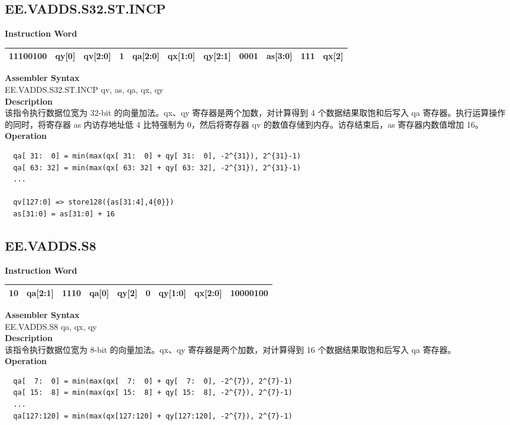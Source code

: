 \clearpage
\subsection{EE.VADDS.S32.ST.INCP}\label{instruction:EEVADDSS32STINCP}
\setlength\tabcolsep{6pt}
\textbf{Instruction Word} \\
\begin{tabular}{|c|c|c|c|c|c|c|c|c|c|c|}
	\hline
	11100100 & qy[0] & qv[2:0] & 1 & qa[2:0] & qx[1:0] & qy[2:1] & 0001 & as[3:0] & 111 & qx[2] \\
	\hline
\end{tabular}

\textbf{Assembler Syntax} \\
EE.VADDS.S32.ST.INCP qv, as, qa, qx, qy \\
\textbf{Description} \\
该指令执行数据位宽为 32-bit 的向量加法。qx、qy 寄存器是两个加数，对计算得到 4 个数据结果取饱和后写入 qa 寄存器。执行运算操作的同时，将寄存器 as 内访存地址低 4 比特强制为 0，然后将寄存器 qv 的数值存储到内存。访存结束后，as 寄存器内数值增加 16。\\
\textbf{Operation}
\begin{lstlisting}
  qa[ 31:  0] = min(max(qx[ 31:  0] + qy[ 31:  0], -2^{31}), 2^{31}-1)
  qa[ 63: 32] = min(max(qx[ 63: 32] + qy[ 63: 32], -2^{31}), 2^{31}-1)
  ...

  qv[127:0] => store128({as[31:4],4{0}})
  as[31:0] = as[31:0] + 16
\end{lstlisting}

\clearpage
\subsection{EE.VADDS.S8}\label{instruction:EEVADDSS8}
\setlength\tabcolsep{6pt}
\textbf{Instruction Word} \\
\begin{tabular}{|c|c|c|c|c|c|c|c|c|}
	\hline
	10 & qa[2:1] & 1110 & qa[0] & qy[2] & 0 & qy[1:0] & qx[2:0] & 10000100 \\
	\hline
\end{tabular}

\textbf{Assembler Syntax} \\
EE.VADDS.S8 qa, qx, qy \\
\textbf{Description} \\
该指令执行数据位宽为 8-bit 的向量加法。qx、qy 寄存器是两个加数，对计算得到 16 个数据结果取饱和后写入 qa 寄存器。\\
\textbf{Operation}
\begin{lstlisting}
  qa[  7:  0] = min(max(qx[  7:  0] + qy[  7:  0], -2^{7}), 2^{7}-1)
  qa[ 15:  8] = min(max(qx[ 15:  8] + qy[ 15:  8], -2^{7}), 2^{7}-1)
  ...
  qa[127:120] = min(max(qx[127:120] + qy[127:120], -2^{7}), 2^{7}-1)
\end{lstlisting}

